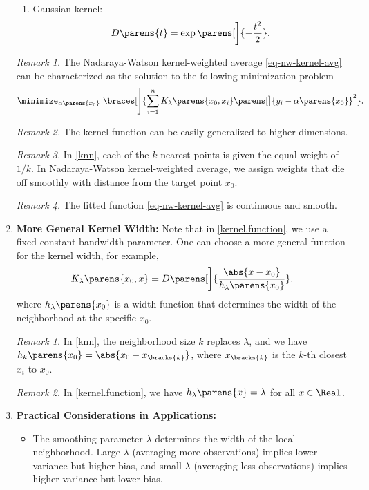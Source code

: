 \documentclass[12pt]{article}
\begin{document}
\begin{enumerate}[label=\textbf{\arabic*.}]
\begin{enumerate}
		\item Gaussian kernel: 
		\begin{align*}
			D \parens{t} = \exp \parens[\bigg]{-\frac{t^2}{2}}. 
		\end{align*}
	\end{enumerate}
	
	\textit{Remark 1.} The Nadaraya-Watson kernel-weighted average \eqref{eq-nw-kernel-avg} can be characterized as the solution to the following minimization problem 
	\begin{align*}
		\minimize_{\alpha \parens{x_0}} \ \braces[\Bigg]{\sum_{i=1}^n K_{\lambda} \parens{x_0, x_i} \parens[\big]{y_i - \alpha \parens{x_0}}^2}. 
	\end{align*}
	
	\textit{Remark 2.} The kernel function can be easily generalized to higher dimensions. 
	
	\textit{Remark 3.} In \eqref{knn}, each of the $k$ nearest points is given the equal weight of $1/k$. In Nadaraya-Watson kernel-weighted average, we assign weights that die off smoothly with distance from the target point $x_0$. 
	
	\textit{Remark 4.} The fitted function \eqref{eq-nw-kernel-avg} is continuous and smooth. 
	
	\item \textbf{More General Kernel Width:} Note that in \eqref{kernel.function}, we use a fixed constant bandwidth parameter.  One can choose a more general function for the kernel width, for example, 
	\begin{align*}
		K_{\lambda} \parens{x_0, x} = D \parens[\bigg]{\frac{\abs{x - x_0}}{h_{\lambda}\parens{x_0}}}, 
	\end{align*}
	where $h_{\lambda} \parens{x_0}$ is a width function that determines the width of the neighborhood at the specific $x_0$. 
	
	\textit{Remark 1.} In \eqref{knn}, the neighborhood size $k$ replaces $\lambda$, and we have $h_k \parens{x_0} = \abs{x_0 - x_{\bracks{k}}}$, where $x_{\bracks{k}}$ is the $k$-th closest $x_i$ to $x_0$. 
	
	\textit{Remark 2.} In \eqref{kernel.function}, we have $h_{\lambda} \parens{x} = \lambda$ for all $x \in \Real$. 
	
	\item \textbf{Practical Considerations in Applications:} 
	\begin{itemize}
		\item The smoothing parameter $\lambda$ determines the width of the local neighborhood. Large $\lambda$ (averaging more observations) implies lower variance but higher bias, and small $\lambda$ (averaging less observations) implies higher variance but lower bias. 
		

\end{itemize}
\end{enumerate}
\end{document}
